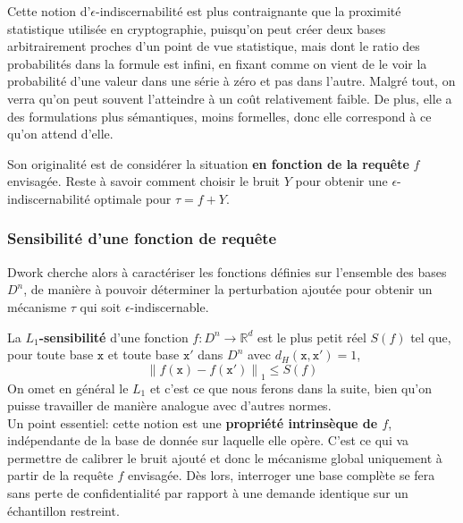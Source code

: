 \documentclass[a4paper,11pt]{article} %
\begin{document}
Cette notion d'$\epsilon$-indiscernabilité est plus contraignante que la \og proximité statistique\fg{} utilisée en cryptographie, puisqu'on peut créer deux bases arbitrairement proches d'un point de vue statistique, mais dont le ratio des probabilités dans la formule est infini, en fixant comme on vient de le voir la probabilité d'une valeur dans une série à zéro et pas dans l'autre.
Malgré tout, on verra qu'on peut souvent l'atteindre à un coût relativement faible. De plus, elle a des formulations plus \og sémantiques\fg{}, moins formelles, donc elle correspond à ce qu'on attend d'elle.

Son originalité est de considérer la situation \textbf{en fonction de la requête} $f$ envisagée. Reste à savoir comment choisir le bruit $Y$ pour obtenir une $\epsilon$-indiscerna\-bilité optimale pour $\tau=f+Y$.
%
\subsubsection{Sensibilité d'une fonction de requête}
%
Dwork cherche alors à caractériser les fonctions définies sur l'ensemble des bases $D^n$, de manière à pouvoir déterminer la perturbation ajoutée pour obtenir un mécanisme $\tau$ qui soit $\epsilon$-indiscernable.

La \textbf{${L_1}$-sensibilité} d'une fonction $f: D^n\rightarrow\mathbb{R}^d$ est le plus petit réel \textbf{$S(f)$} tel que, pour toute base $\mathtt{x}$ et toute base $\mathtt{x'}$ dans $D^n$ avec $d_H(\mathtt{x},\mathtt{x'})=1$,
\[\left\| f(\mathtt{x})-f(\mathtt{x'})\right\|_1\leqslant S(f)\]
On omet en général le $L_1$ et c'est ce que nous ferons dans la suite, bien qu'on puisse travailler de manière analogue avec d'autres normes.\\[-0.4em]

Un point essentiel: cette notion est une \textbf{propriété intrinsèque de $f$}, indépendante de la base de donnée sur laquelle elle opère. 
C'est ce qui va permettre de calibrer le bruit ajouté et donc le mécanisme global uniquement à partir de la requête $f$ envisagée. 
Dès lors, interroger une base complète se fera sans perte de confidentialité par rapport à une demande identique sur un échantillon restreint.\\[-0.4em]
\end{document}
